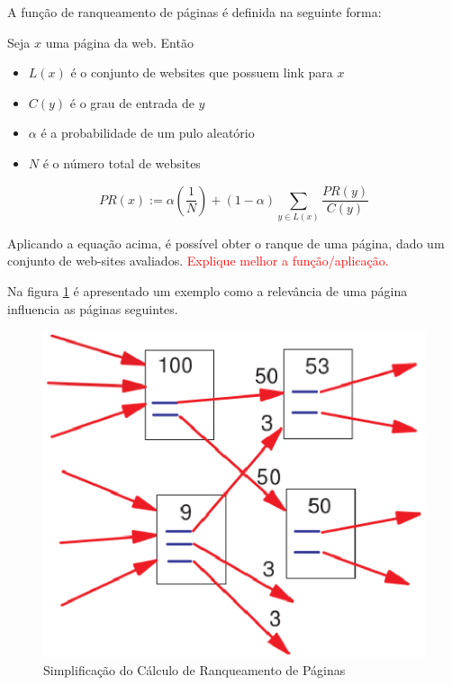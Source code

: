 A função de ranqueamento de páginas é definida na seguinte forma:

Seja $x$ uma página da web. Então
\begin{itemize}
    \item $L(x)$ é o conjunto de websites que possuem link para $x$
    \item $C(y)$ é o grau de entrada de $y$
    \item $\alpha$ é a probabilidade de um pulo aleatório
    \item $N$ é o número total de websites
\end{itemize}
\[\displaystyle PR(x) := \alpha \left ( \frac{1}{N} \right ) + (1-\alpha) \sum_{y\in L(x)} \frac{PR(y)}{C(y)}\]

Aplicando a equação acima, é possível obter o ranque de uma página, dado um conjunto de web-sites avaliados. \textcolor{red}{Explique melhor a função/aplicação.}

 Na figura \ref{fig:page_rank} é apresentado um exemplo como a relevância de uma página influencia as páginas seguintes.

\begin{figure}[h]
    \centering
        \includegraphics[keepaspectratio=true,scale=0.5]{figuras/page_rank.eps}
    \caption{Simplificação do Cálculo de Ranqueamento de Páginas}
    \label{fig:page_rank}
\end{figure}

